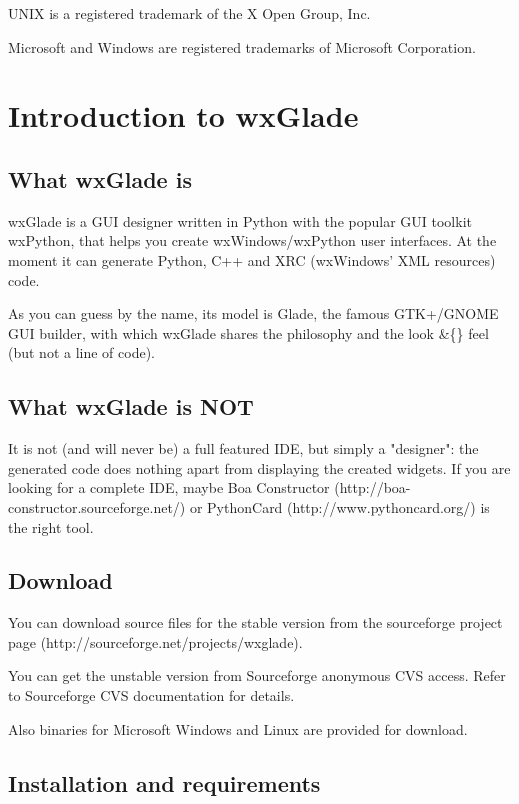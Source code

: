 \documentclass[a4paper,10pt]{report}
\begin{document}
UNIX is a registered trademark of the X Open Group, Inc.

Microsoft and Windows are registered trademarks of Microsoft
Corporation.


\chapter{Introduction to wxGlade}

\section{What wxGlade is }

wxGlade is a GUI designer written in Python with the popular
GUI toolkit wxPython, that helps you create wxWindows/wxPython
user interfaces. At the moment it can generate Python, C++ and
XRC (wxWindows' XML resources) code.

As you can guess by the name, its model is Glade, the famous
GTK+/GNOME GUI builder, with which wxGlade shares the philosophy
and the look \&\{\} feel (but not a line of code).


\section{What wxGlade is NOT}

It is not (and will never be) a full featured IDE, but simply
a "designer": the generated code does nothing apart from displaying
the created widgets. If you are looking for a complete IDE,
maybe Boa Constructor (http://boa-constructor.sourceforge.net/)
or PythonCard (http://www.pythoncard.org/) is the right tool.



\section{Download}
You can download source files for the stable version from the
sourceforge project page (http://sourceforge.net/projects/wxglade).


You can get the unstable version from Sourceforge anonymous CVS
access. Refer to Sourceforge CVS documentation for details.


Also binaries for Microsoft Windows and Linux are provided for
download.

\section{Installation and requirements}
\end{document}
